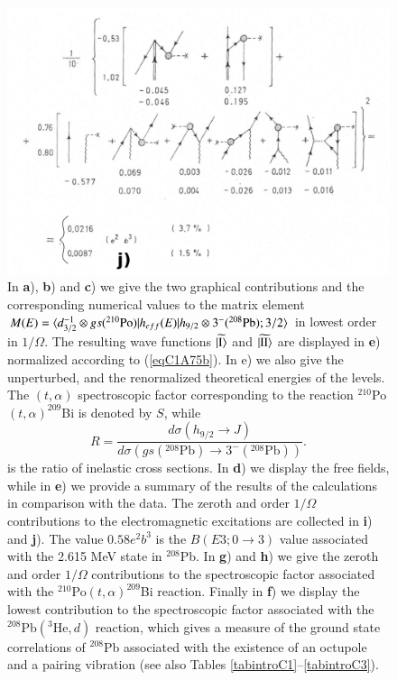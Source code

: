                    \begin{figure}
                   \captionsetup{singlelinecheck=off}
                   \centerline {
                   \includegraphics*[width=12cm]{introduccion/figs/fig24c}
                   }
                   \caption[.]{In \textbf{a}), \textbf{b}) and \textbf{c}) we give the two graphical contributions and the corresponding numerical values to the matrix element $M(E)=\langle {d_{3/2}^{-1}\otimes gs(^{210}\text{Po})|h_{eff}(E)|h_{9/2}\otimes 3^-(^{208}\text{Pb});3/2} \rangle$ in lowest order in $1/\Omega.$ The resulting wave functions $\widetilde{|{\text{I}} \rangle}$ and $\widetilde{|{\text{II}} \rangle}$ are displayed in \textbf{e}) normalized according to (\ref{eqC1A75b}). In e) we also give the unperturbed, and the renormalized theoretical energies of the levels. The $(t,\alpha)$ spectroscopic factor corresponding to the reaction $^{210}$Po$(t,\alpha)^{209}$Bi is denoted by $S$, while 
                   \begin{equation*}
                   R=\frac{d\sigma(h_{9/2}\rightarrow J)}{d\sigma(gs(^{208}\text{Pb})\rightarrow3^-(^{208}\text{Pb}))}.
                   \end{equation*}
                   is the ratio of inelastic cross sections. In \textbf{d}) we display the free fields, while in \textbf{e}) we provide a summary of the results of the calculations in comparison with the data. The zeroth and order $1/\Omega$ contributions to the electromagnetic excitations are collected in \textbf{i}) and \textbf{j}). The value $0.58 e^2b^3$ is the $B(E3;0\rightarrow 3)$ value associated with the 2.615 MeV state in $^{208}$Pb. In \textbf{g}) and \textbf{h}) we give the zeroth and order $1/\Omega$ contributions to the spectroscopic factor associated with the $^{210}$Po$(t,\alpha)^{209}$Bi reaction. Finally in \textbf{f}) we display the lowest contribution to the spectroscopic factor associated with the $^{208}$Pb$(^3\text{He},d)$ reaction, which gives a measure of the ground state correlations of $^{208}$Pb associated with the existence of an octupole and a pairing vibration (see also Tables \ref{tabintroC1}--\ref{tabintroC3}).}
                   \label{figC1A7}
                   \end{figure}
